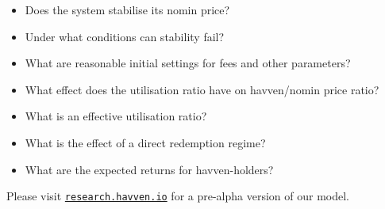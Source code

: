 \begin{itemize}
    \item Does the system stabilise its nomin price?
    \item Under what conditions can stability fail?
    \item What are reasonable initial settings for fees and other parameters?
    \item What effect does the utilisation ratio have on havven/nomin price ratio?
    \item What is an effective utilisation ratio?
    \item What is the effect of a direct redemption regime?
    \item What are the expected returns for havven-holders?
\end{itemize}






\noindent Please visit \href{http://research.havven.io}{\texttt{research.havven.io}} for a pre-alpha version of our model.

\pagebreak
